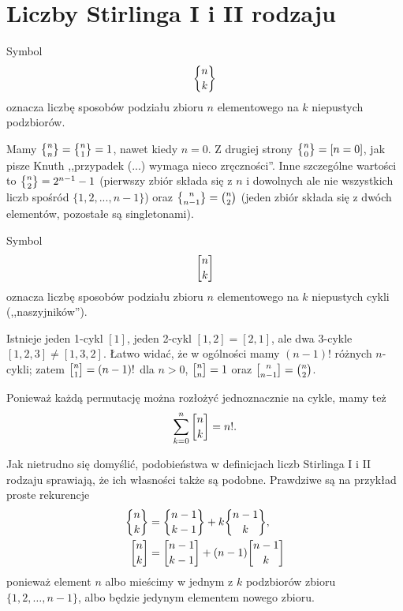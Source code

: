 \section{Liczby Stirlinga I i II rodzaju}

\begin{definition}
	Symbol
	\begin{equation}
		\stirlingtwo{n}{k}
	\end{equation}
	oznacza liczbę sposobów podziału zbioru $n$ elementowego na $k$ niepustych podzbiorów.
\end{definition}

Mamy $\stirlingtwo{n}{n} = \stirlingtwo{n}{1} = 1$, nawet kiedy $n = 0$.
Z drugiej strony $\stirlingtwo{n}{0} = [n = 0]$, jak pisze Knuth ,,przypadek (...) wymaga nieco zręczności''.
Inne szczególne wartości to $\stirlingtwo{n}{2} = 2^{n-1}-1$ (pierwszy zbiór składa się z $n$ i dowolnych ale nie wszystkich liczb spośród $\{1, 2, ..., n-1\}$) oraz $\stirlingtwo{n}{n-1} = {n \choose 2}$ (jeden zbiór składa się z dwóch elementów, pozostałe są singletonami).


\begin{definition}
	Symbol
	\begin{equation}
		\stirlingone{n}{k}
	\end{equation}
	oznacza liczbę sposobów podziału zbioru $n$ elementowego na $k$ niepustych cykli (,,naszyjników'').
\end{definition}

Istnieje jeden 1-cykl $[1]$, jeden 2-cykl $[1, 2] = [2, 1]$, ale dwa 3-cykle $[1, 2, 3] \neq [1, 3, 2]$.
Łatwo widać, że w ogólności mamy $(n-1)!$ różnych $n$-cykli; zatem $\stirlingone{n}{1} = (n-1)!$ dla $n > 0$, $\stirlingone{n}{n} = 1$ oraz $\stirlingone{n}{n-1} = {n \choose 2}$.

Ponieważ każdą permutację można rozłożyć jednoznacznie na cykle, mamy też
\begin{equation}
	\sum_{k=0}^n \stirlingone{n}{k} = n!.
\end{equation}


Jak nietrudno się domyślić, podobieństwa w definicjach liczb Stirlinga I i II rodzaju sprawiają, że ich własności także są podobne.
Prawdziwe są na przykład proste rekurencje
\begin{align}
	\stirlingtwo{n}{k} & = \stirlingtwo{n-1}{k-1} + k \stirlingtwo{n-1}{k}, \\
	\stirlingone{n}{k} & = \stirlingone{n-1}{k-1} + (n-1) \stirlingone{n-1}{k}
\end{align}
ponieważ element $n$ albo mieścimy w jednym z $k$ podzbiorów zbioru $\{1, 2, \ldots, n-1\}$, albo będzie jedynym elementem nowego zbioru.

